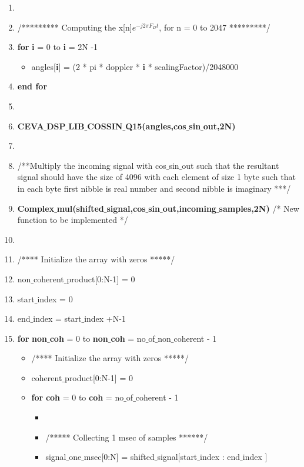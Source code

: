 \documentclass[journal,10pt,onecolumn]{article}
\begin{document}
\begin{itemize}
\begin{enumerate}
\begin{enumerate}
        \item[] 
        \item[]  /********* Computing the x[n]$e^{-j2 \pi F_Dt}$, for n = 0 to 2047 *********/
        \item[] \textbf{for} \textbf{i} = 0 to \textbf{i} = 2N -1
        \begin{itemize}
            \item[] angles[\textbf{i}] = (2 * pi * doppler * \textbf{i} * scalingFactor)/2048000
        \end{itemize}
        \item[] \textbf{end for}
        \item[] 
        \item[] \textbf{CEVA$\_$DSP$\_$LIB$\_$COSSIN$\_$Q15(angles,cos$\_$sin$\_$out,2N)} 
        \item[]
        \item[] /**Multiply the incoming signal with cos$\_$sin$\_$out such that the resultant signal should have the size of 4096 with each element of size 1 byte such that in each byte first nibble is real number and second nibble is imaginary ***/
        \item[] \textbf{Complex$\_$mul(shifted$\_$signal,cos$\_$sin$\_$out,incoming$\_$samples,2N)} /* New function to be implemented */
        \item[] 
        \item[] /**** Initialize the array with zeros *****/
        \item[] non$\_$coherent$\_$product[0:N-1] = 0
        \item[] start$\_$index = 0
        \item[] end$\_$index = start$\_$index +N-1
        \item[] \textbf{for}  \textbf{non$\_$coh} = 0 to  \textbf{non$\_$coh} =  no$\_$of$\_$non$\_$coherent - 1
        \begin{itemize}
            \item[] /**** Initialize the array with zeros *****/
            \item[] coherent$\_$product[0:N-1] = 0
            \item[] \textbf{for} \textbf{coh} = 0 to  \textbf{coh} = no$\_$of$\_$coherent - 1
            \begin{itemize}
                \item[]
                \item[] /***** Collecting 1 msec of samples ******/
                \item[] signal$\_$one$\_$msec[0:N] = shifted$\_$signal[start$\_$index : end$\_$index ]

\end{itemize}
\end{itemize}
\end{enumerate}
\end{enumerate}
\end{itemize}
\end{document}
